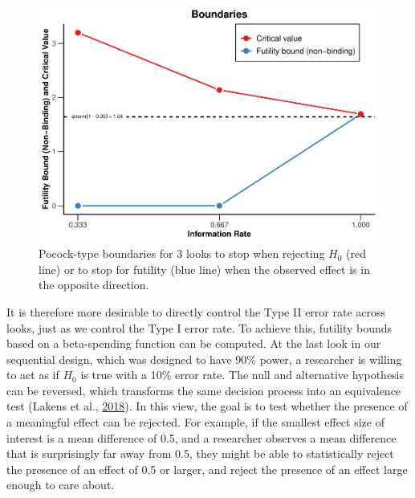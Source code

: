 \documentclass[
  english,
  ,jou, a4paper,floatsintext]{apa6}
\begin{document}
\begin{figure}
\centering
\includegraphics{sequential_tutorial_files/figure-latex/futility1-1.pdf}
\caption{\label{fig:futility1}Pocock-type boundaries for 3 looks to stop when rejecting \(H_0\) (red line) or to stop for futility (blue line) when the observed effect is in the opposite direction.}
\end{figure}

It is therefore more desirable to directly control the Type II error rate across looks, just as we control the Type I error rate. To achieve this, futility bounds based on a beta-spending function can be computed. At the last look in our sequential design, which was designed to have 90\% power, a researcher is willing to act as if \(H_0\) is true with a 10\% error rate. The null and alternative hypothesis can be reversed, which transforms the same decision process into an equivalence test (Lakens et al., \protect\hyperlink{ref-lakens_equivalence_2018}{2018}). In this view, the goal is to test whether the presence of a meaningful effect can be rejected. For example, if the smallest effect size of interest is a mean difference of 0.5, and a researcher observes a mean difference that is surprisingly far away from 0.5, they might be able to statistically reject the presence of an effect of 0.5 or larger, and reject the presence of an effect large enough to care about.
\end{document}
